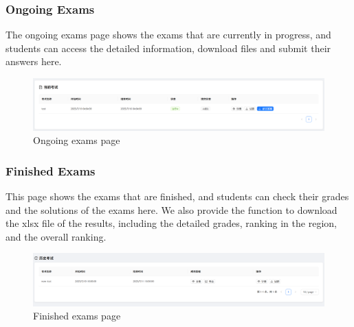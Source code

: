 \documentclass[12pt]{article}
\begin{document}
\subsubsection{Ongoing Exams}
The ongoing exams page shows the exams that are currently in progress, and students can access the detailed information,
download files and submit their answers here.
\begin{figure}[H]
    \centering
    \includegraphics[width=\textwidth]{student/test-ing.png}
    \caption{Ongoing exams page}
    \label{fig:OngoingExams page}
\end{figure}
\subsubsection{Finished Exams}
This page shows the exams that are finished, and students can check their grades and the solutions of the exams here.
We also provide the function to download the xlsx file of the results, including the detailed grades, ranking in the region, and the overall ranking.
\begin{figure}[H]
    \centering
    \includegraphics[width=\textwidth]{student/test-his.png}
    \caption{Finished exams page}
    \label{fig:FinishedExams page}
\end{figure}
\end{document}
